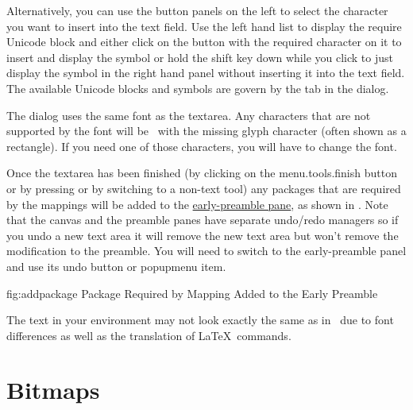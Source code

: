 Alternatively, you can use the button panels on the left to
select the character you want to insert into the text field. Use the
left hand list to display the require Unicode block and either click
on the button with the required character on it to insert and
display the symbol or hold the shift key down while you click to
just display the symbol in the right hand panel without inserting it
into the text field. The available Unicode blocks and symbols are govern by the
 tab in the  dialog.

\begin{information}
The  dialog uses the same font as the
\gls{textarea}. Any characters that are not supported by the font
will be \rendered\ with the missing glyph character (often shown as a
rectangle). If you need one of those characters, you will have to change the font.
\end{information}

Once the \gls{textarea} has been finished (by clicking on the
\gls{menu.tools.finish} button or by pressing
 or by switching to a non-text
tool) any packages that are required by the mappings will be added
to the \hyperref[sec:preamblepanels]{early-preamble pane}, as shown in
.  Note that the \gls{canvas} and the
preamble panes have separate undo\slash redo managers so if you undo
a new text area it will remove the new text area but won't remove
the modification to the preamble. You will need to switch to the
early-preamble panel and use its undo button or \gls{popupmenu} item.

\FloatFig
  {fig:addpackage}
  {}
  {Package Required by Mapping Added to the Early Preamble}

\begin{important}
The text in your  environment may not
look exactly the same as in \FlowframTk\ due to font differences as
well as the translation of \LaTeX\ commands.
\end{important}


\section{Bitmaps}\label{sec:insertbitmap}

